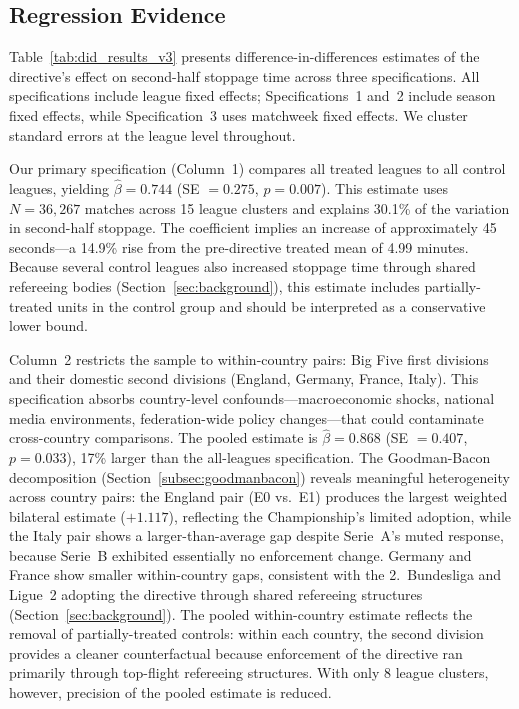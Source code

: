\documentclass[12pt]{article}
\begin{document}
\subsection{Regression Evidence}
\label{subsec:regression}

Table~\ref{tab:did_results_v3} presents difference-in-differences estimates of the directive's effect on second-half stoppage time across three specifications. All specifications include league fixed effects; Specifications~1 and~2 include season fixed effects, while Specification~3 uses matchweek fixed effects. We cluster standard errors at the league level throughout.



Our primary specification (Column~1) compares all treated leagues to all control leagues, yielding $\hat{\beta} = 0.744$ (SE $= 0.275$, $p = 0.007$). This estimate uses $N = 36{,}267$ matches across 15 league clusters and explains 30.1\% of the variation in second-half stoppage. The coefficient implies an increase of approximately 45 seconds---a 14.9\% rise from the pre-directive treated mean of 4.99 minutes. Because several control leagues also increased stoppage time through shared refereeing bodies (Section~\ref{sec:background}), this estimate includes partially-treated units in the control group and should be interpreted as a conservative lower bound.

Column~2 restricts the sample to within-country pairs: Big Five first divisions and their domestic second divisions (England, Germany, France, Italy). This specification absorbs country-level confounds---macroeconomic shocks, national media environments, federation-wide policy changes---that could contaminate cross-country comparisons. The pooled estimate is $\hat{\beta} = 0.868$ (SE $= 0.407$, $p = 0.033$), 17\% larger than the all-leagues specification. The Goodman-Bacon decomposition (Section~\ref{subsec:goodmanbacon}) reveals meaningful heterogeneity across country pairs: the England pair (E0 vs.\ E1) produces the largest weighted bilateral estimate ($+1.117$), reflecting the Championship's limited adoption, while the Italy pair shows a larger-than-average gap despite Serie~A's muted response, because Serie~B exhibited essentially no enforcement change. Germany and France show smaller within-country gaps, consistent with the 2.~Bundesliga and Ligue~2 adopting the directive through shared refereeing structures (Section~\ref{sec:background}). The pooled within-country estimate reflects the removal of partially-treated controls: within each country, the second division provides a cleaner counterfactual because enforcement of the directive ran primarily through top-flight refereeing structures. With only 8 league clusters, however, precision of the pooled estimate is reduced.
\end{document}
